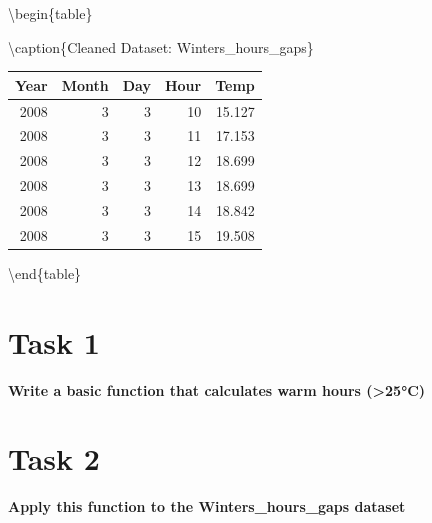 \documentclass[
]{book}
\newenvironment{Shaded}{\begin{snugshade}}{\end{snugshade}}
\newcommand{\CommentTok}[1]{\textcolor[rgb]{0.56,0.35,0.01}{\textit{#1}}}
\newcommand{\ControlFlowTok}[1]{\textcolor[rgb]{0.13,0.29,0.53}{\textbf{#1}}}
\newcommand{\DataTypeTok}[1]{\textcolor[rgb]{0.13,0.29,0.53}{#1}}
\newcommand{\DecValTok}[1]{\textcolor[rgb]{0.00,0.00,0.81}{#1}}
\newcommand{\FloatTok}[1]{\textcolor[rgb]{0.00,0.00,0.81}{#1}}
\newcommand{\KeywordTok}[1]{\textcolor[rgb]{0.13,0.29,0.53}{\textbf{#1}}}
\newcommand{\NormalTok}[1]{#1}
\newcommand{\OperatorTok}[1]{\textcolor[rgb]{0.81,0.36,0.00}{\textbf{#1}}}
\newcommand{\StringTok}[1]{\textcolor[rgb]{0.31,0.60,0.02}{#1}}
\begin{document}
\textbackslash begin\{table\}

\textbackslash caption\{\label{tab:unnamed-chunk-4}Cleaned Dataset: Winters\_hours\_gaps\}
\fontsize{10}{12}\selectfont

\begin{tabular}[t]{r|r|r|r|r}
\hline
Year & Month & Day & Hour & Temp\\
\hline
2008 & 3 & 3 & 10 & 15.127\\
\hline
2008 & 3 & 3 & 11 & 17.153\\
\hline
2008 & 3 & 3 & 12 & 18.699\\
\hline
2008 & 3 & 3 & 13 & 18.699\\
\hline
2008 & 3 & 3 & 14 & 18.842\\
\hline
2008 & 3 & 3 & 15 & 19.508\\
\hline
\end{tabular}

\textbackslash end\{table\}

\hypertarget{task-1-2}{%
\section{Task 1}\label{task-1-2}}

\textbf{Write a basic function that calculates warm hours (\textgreater25°C)}

\begin{Shaded}
\end{Shaded}

\hypertarget{task-2-2}{%
\section{Task 2}\label{task-2-2}}

\textbf{Apply this function to the Winters\_hours\_gaps dataset}

\begin{Shaded}
\end{Shaded}
\end{document}
